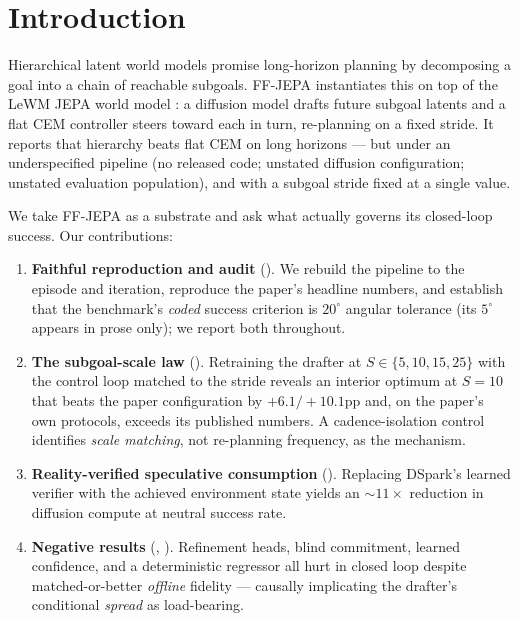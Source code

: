 \documentclass[11pt]{article}
\newcommand{\degc}[1]{$#1^\circ$}
\begin{document}
\section{Introduction}
\label{sec:intro}

Hierarchical latent world models promise long-horizon planning by decomposing a goal
into a chain of reachable subgoals. FF-JEPA \citep{ffjepa} instantiates this on top of
the LeWM JEPA world model \citep{lewm}: a diffusion model drafts future subgoal latents
and a flat CEM controller \citep{cem} steers toward each in turn, re-planning on a fixed
stride. It reports that hierarchy beats flat CEM on long horizons --- but under an
underspecified pipeline (no released code; unstated diffusion configuration; unstated
evaluation population), and with a subgoal stride fixed at a single value.

We take FF-JEPA as a substrate and ask what actually governs its closed-loop success.
Our contributions:

\begin{enumerate}[itemsep=2pt,topsep=2pt]
\item \textbf{Faithful reproduction and audit} (). We rebuild the
pipeline to the episode and iteration, reproduce the paper's headline numbers, and
establish that the benchmark's \emph{coded} success criterion is \degc{20} angular
tolerance (its \degc{5} appears in prose only); we report both throughout.
\item \textbf{The subgoal-scale law} (). Retraining the drafter at
$S\in\{5,10,15,25\}$ with the control loop matched to the stride reveals an interior
optimum at $S{=}10$ that beats the paper configuration by $+6.1/+10.1$pp and, on the
paper's own protocols, exceeds its published numbers. A cadence-isolation control
identifies \emph{scale matching}, not re-planning frequency, as the mechanism.
\item \textbf{Reality-verified speculative consumption} (). Replacing
DSpark's learned verifier with the achieved environment state yields an
${\sim}11\times$ reduction in diffusion compute at neutral success rate.
\item \textbf{Negative results} (, ). Refinement heads,
blind commitment, learned confidence, and a deterministic regressor all hurt in closed
loop despite matched-or-better \emph{offline} fidelity --- causally implicating the
drafter's conditional \emph{spread} as load-bearing.
\end{enumerate}
\end{document}
